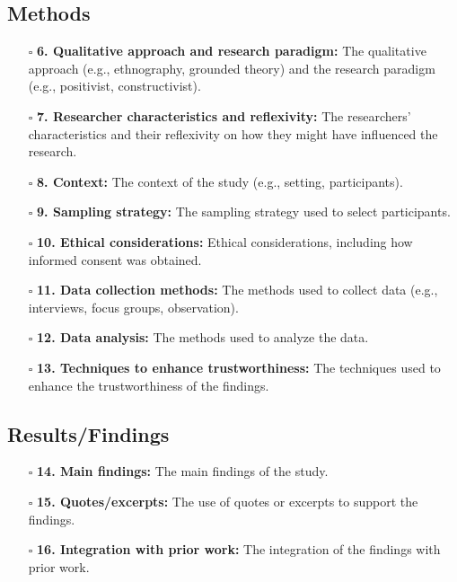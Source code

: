 \documentclass[11pt]{article}
\def\tightlist{}
\begin{document}
\begin{Form}
\subsection{Methods}\label{methods}

\begin{itemize}
\tightlist
\item[$\square$]
  \textbf{6. Qualitative approach and research paradigm:} The
  qualitative approach (e.g., ethnography, grounded theory) and the
  research paradigm (e.g., positivist, constructivist).
\item[$\square$]
  \textbf{7. Researcher characteristics and reflexivity:} The
  researchers' characteristics and their reflexivity on how they might
  have influenced the research.
\item[$\square$]
  \textbf{8. Context:} The context of the study (e.g., setting,
  participants).
\item[$\square$]
  \textbf{9. Sampling strategy:} The sampling strategy used to select
  participants.
\item[$\square$]
  \textbf{10. Ethical considerations:} Ethical considerations, including
  how informed consent was obtained.
\item[$\square$]
  \textbf{11. Data collection methods:} The methods used to collect data
  (e.g., interviews, focus groups, observation).
\item[$\square$]
  \textbf{12. Data analysis:} The methods used to analyze the data.
\item[$\square$]
  \textbf{13. Techniques to enhance trustworthiness:} The techniques
  used to enhance the trustworthiness of the findings.
\end{itemize}

\subsection{Results/Findings}\label{resultsfindings}

\begin{itemize}
\tightlist
\item[$\square$]
  \textbf{14. Main findings:} The main findings of the study.
\item[$\square$]
  \textbf{15. Quotes/excerpts:} The use of quotes or excerpts to support
  the findings.
\item[$\square$]
  \textbf{16. Integration with prior work:} The integration of the
  findings with prior work.
\end{itemize}


\end{Form}
\end{document}
